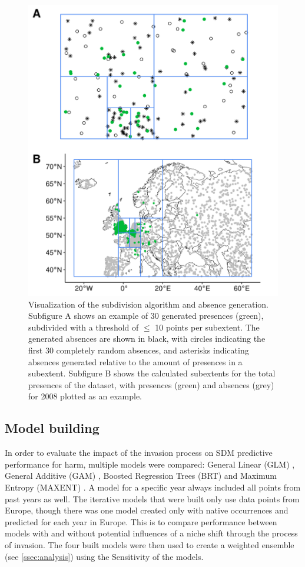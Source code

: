 \documentclass[12pt,a4paper]{article}
\begin{document}
\begin{figure}[!h]
    \centering
    \includegraphics[width = 0.8\linewidth]{"../../R/figures/ext-subdiv.png"}
    \caption{\label{fig:ext_subdiv} Visualization of the subdivision algorithm and absence generation. Subfigure A shows an example of 30 generated presences (green), subdivided with a threshold of $\leq$ 10 points per subextent. The generated absences are shown in black, with circles indicating the first 30 completely random absences, and asterisks indicating absences generated relative to the amount of presences in a subextent. Subfigure B shows the calculated subextents for the total presences of the dataset, with presences (green) and absences (grey) for 2008 plotted as an example.}
\end{figure}

\subsection{Model building} \label{ssec:modelbuilding}

In order to evaluate the impact of the invasion process on SDM predictive performance for \gls{harm}, multiple models were compared: General Linear (GLM) \autocite{guisan2002glm-gam}, General Additive (GAM) \autocite{guisan2002glm-gam}, Boosted Regression Trees (BRT) \autocite{elith2008brt} and Maximum Entropy (MAXENT) \autocite{phillips2017maxnet}.
A model for a specific year always included all points from past years as well.
The iterative models that were built only use data points from Europe, though there was one model created only with native occurrences and predicted for each year in Europe.
This is to compare performance between models with and without potential influences of a niche shift through the process of invasion.
The four built models were then used to create a weighted ensemble (see \ref{ssec:analysis}) using the Sensitivity of the models.
\end{document}

